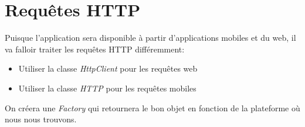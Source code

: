 \documentclass[french]{report}
\begin{document}
\section{Requêtes HTTP}
Puisque l'application sera disponible à partir d'applications mobiles et du web,
il va falloir traiter les requêtes HTTP différemment:
\begin{itemize}
    \item Utiliser la classe \textit{HttpClient} pour les requêtes web
    \item Utiliser la classe \textit{HTTP} pour les requêtes mobiles
\end{itemize}
On créera une \textit{Factory} qui retournera le bon objet en fonction de la
plateforme où nous nous trouvons.
\end{document}
